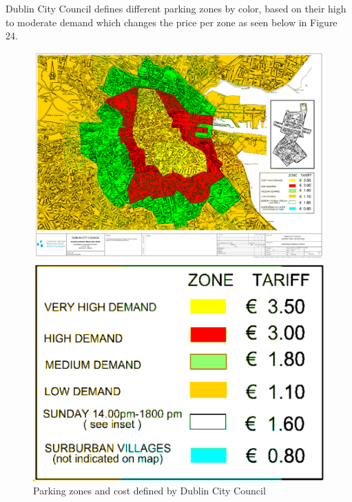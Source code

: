 Dublin City Council defines different parking zones by color, based on their
high to moderate demand which changes the price per zone as seen below in Figure
24.

\begin{figure}[htbp]
  \centering
  \begin{minipage}{0.45\textwidth}
    \centering
    \includegraphics[width=\textwidth]{images/Parking_zones_map.png}
  \end{minipage}
  \hfill
  \begin{minipage}{0.45\textwidth}
    \centering
    \includegraphics[width=\textwidth]{images/Parking_zones_cost.png}
  \end{minipage}
  \caption{Parking zones and cost defined by Dublin City Council}
  \label{fig:Parking_zones}
\end{figure}

